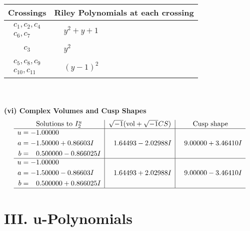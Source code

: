 \documentclass[1p]{elsarticle_modified}
\theoremstyle{definition}
\newcommand{\I}{\sqrt{-1}}
\begin{document}
\begin{tabular}{m{50pt}|m{274pt}}
Crossings & \hspace{64pt}Riley Polynomials at each crossing \\
\hline $$\begin{aligned}c_{1},c_{2},c_{4}\\c_{6},c_{7}\end{aligned}$$&$\begin{aligned}
&y^2+y+1
\end{aligned}$\\
\hline $$\begin{aligned}c_{3}\end{aligned}$$&$\begin{aligned}
&y^2
\end{aligned}$\\
\hline $$\begin{aligned}c_{5},c_{8},c_{9}\\c_{10},c_{11}\end{aligned}$$&$\begin{aligned}
&(y-1)^2
\end{aligned}$\\
\hline
\end{tabular}\\~\\
\newpage\flushleft \textbf{(vi) Complex Volumes and Cusp Shapes}
$$\begin{array}{c|c|c}  
\text{Solutions to }I^u_{2}& \I (\text{vol} + \sqrt{-1}CS) & \text{Cusp shape}\\
 \hline 
\begin{aligned}
u &= -1.00000\phantom{ +0.000000I} \\
a &= -1.50000 + 0.86603 I \\
b &= \phantom{-}0.500000 - 0.866025 I\end{aligned}
 & \phantom{-}1.64493 - 2.02988 I & \phantom{-}9.00000 + 3.46410 I \\ \hline\begin{aligned}
u &= -1.00000\phantom{ +0.000000I} \\
a &= -1.50000 - 0.86603 I \\
b &= \phantom{-}0.500000 + 0.866025 I\end{aligned}
 & \phantom{-}1.64493 + 2.02988 I & \phantom{-}9.00000 - 3.46410 I\\
 \hline 
 \end{array}$$\newpage
\newpage\renewcommand{\arraystretch}{1}
\centering \section*{ III. u-Polynomials}
\end{document}
